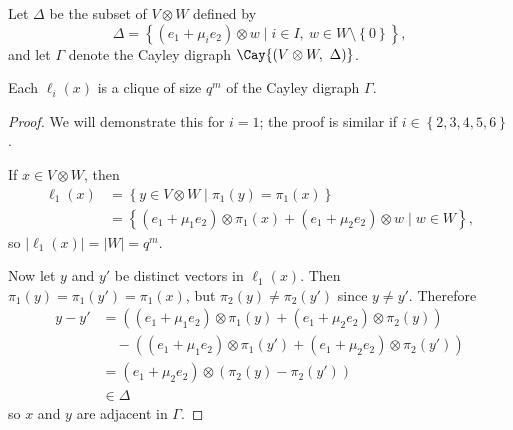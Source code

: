 \begin{defi} \label{def:hamming-union}
Let $\Delta$ be the subset of $V \otimes W$ defined by
\begin{displaymath}
    \Delta = {\left\{\left(e_1 + \mu_i e_2 \right) \otimes w \mid i \in I,\ w \in W \setminus \left\{0 \right\}\right\}},
\end{displaymath}
and let $\Gamma$ denote the Cayley digraph $\Cay{\left(V \otimes W,\ \Delta \right)}$.
\end{defi}

\begin{lemma} \label{lm:cliques}
Each $\ell_i{\left(x \right)}$ is a clique of size $q^m$ of the Cayley digraph $\Gamma$.
\end{lemma}
\begin{proof}
We will demonstrate this for $i = 1$; the proof is similar if $i \in \left\{2, 3, 4, 5, 6 \right\}$.

If $x \in V \otimes W$, then
\begin{align*}
    \ell_1{\left(x \right)} &= \left\{y \in V \otimes W \mid \pi_1{\left(y \right)} = \pi_1{\left(x \right)}\right\} \\
    &= {\left\{\left(e_1 + \mu_1 e_2 \right) \otimes \pi_1{\left(x \right)} + \left(e_1 + \mu_2 e_2 \right) \otimes w \mid w \in W \right\}},
\end{align*}
so $\left|\ell_1{\left(x \right)} \right| = \left|W \right| = q^m$.

Now let $y$ and $y'$ be distinct vectors in $\ell_1{\left(x \right)}$. Then $\pi_1{\left(y \right)} = \pi_1{\left(y' \right)} = \pi_1{\left(x \right)}$, but $\pi_2{\left(y \right)} \neq \pi_2{\left(y' \right)}$ since $y \neq y'$. Therefore
\begin{align*}
    y-y' &= \left(\left(e_1 + \mu_1 e_2 \right) \otimes \pi_1{\left(y \right)} + \left(e_1 + \mu_2 e_2 \right) \otimes \pi_2{\left(y \right)}\right) \\
    & \quad - \left(\left(e_1 + \mu_1 e_2 \right) \otimes \pi_1{\left(y' \right)} + \left(e_1 + \mu_2 e_2 \right) \otimes \pi_2{\left(y' \right)}\right) \\
    &= \left(e_1 + \mu_2 e_2 \right) \otimes \left(\pi_2{\left(y \right)} - \pi_2{\left(y' \right)}\right) \\
    &\in \Delta
\end{align*}
so $x$ and $y$ are adjacent in $\Gamma$.
\end{proof}


